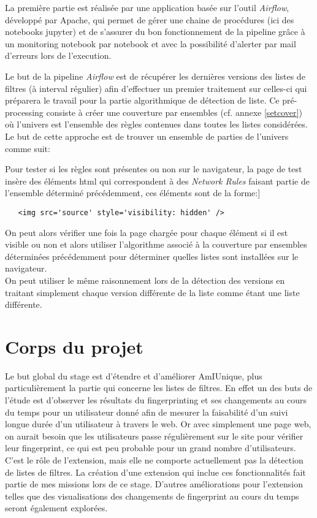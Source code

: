 \documentclass[oneside,a4paper,12pt]{article}
\begin{document}
La première partie est réalisée par une application basée sur l'outil \textit{Airflow}, développé par Apache, qui permet de gérer une chaine de procédures (ici des notebooks jupyter) et de s'assurer du bon fonctionnement de la pipeline grâce à un monitoring notebook par notebook et avec la possibilité d'alerter par mail d'erreurs lors de l'execution.

Le but de la pipeline \textit{Airflow} est de récupérer les dernières versions des listes de filtres (à interval régulier) afin d'effectuer un premier traitement sur celles-ci qui préparera le travail pour la partie algorithmique de détection de liste. Ce pré-processing consiste à créer une couverture par ensembles (cf. annexe \ref{setcover}) où l'univers est l'ensemble des règles contenues dans toutes les listes considérées. Le but de cette approche est de trouver un ensemble de parties de l'univers comme suit:

Pour tester si les règles sont présentes ou non sur le navigateur, la page de test insère des éléments html qui correspondent à des \textit{Network Rules} faisant partie de l'ensemble déterminé précédemment, ces éléments sont de la forme:]
\begin{center}
\begin{lstlisting}
   <img src='source' style='visibility: hidden' />
\end{lstlisting}
\end{center}

On peut alors vérifier une fois la page chargée pour chaque élément si il est visible ou non et alors utiliser l'algorithme associé à la couverture par ensembles déterminées précédemment pour déterminer quelles listes sont installées sur le navigateur.\\

On peut utiliser le même raisonnement lors de la détection des versions en traitant simplement chaque version différente de la liste comme étant une liste différente.


\section{Corps du projet}\label{Projet}

Le but global du stage est d'étendre et d'améliorer AmIUnique, plus particulièrement la partie qui concerne les listes de filtres. En effet un des buts de l'étude est d'observer les résultats du fingerprinting et ses changements au cours du temps pour un utilisateur donné afin de mesurer la faisabilité d'un suivi longue durée d'un utilisateur à travers le web.
Or avec simplement une page web, on aurait besoin que les utilisateurs passe régulièrement sur le site pour vérifier leur fingerprint, ce qui est peu probable pour un grand nombre d'utilisateurs.
C'est le rôle de l'extension, mais elle ne comporte actuellement pas la détection de listes de filtres. La création d'une extension qui inclue ces fonctionnalités fait partie de mes missions lors de ce stage. D'autres améliorations pour l'extension telles que des visualisations des changements de fingerprint au cours du temps seront également explorées.
\end{document}
